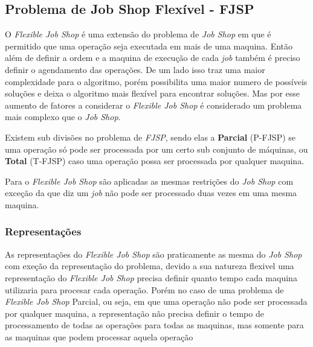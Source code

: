     \subsection{Problema de Job Shop Flexível - FJSP}
            O \textit{Flexible Job Shop} é uma extensão do problema de \textit{Job Shop} em que é permitido que uma operação seja executada em mais de uma maquina. Então além de definir a ordem e a maquina de execução de cada \textit{job} também é preciso definir o agendamento das operações.\newline 
            De um lado isso traz uma maior complexidade para o algoritmo, porém possibilita uma maior numero de possíveis soluções e deixa o algoritmo mais flexível para encontrar soluções. Mas por esse aumento de fatores a considerar o \textit{Flexible Job Shop} é considerado um problema mais complexo que o \textit{Job Shop}.\newline

            Existem sub divisões no problema de \textit{FJSP}, sendo elas a \textbf{Parcial} (P-FJSP) se uma operação só pode ser processada por um certo sub conjunto de máquinas, ou \textbf{Total} (T-FJSP) caso uma operação possa ser processada por qualquer maquina.\newline

            Para o \textit{Flexible Job Shop} são aplicadas as mesmas restrições do \textit{Job Shop} com exceção da que diz um \textit{job} não pode ser processado duas vezes em uma mesma maquina.\newline

        \subsubsection{Representações}
            As representações do \textit{Flexible Job Shop} são praticamente as mesma do \textit{Job Shop} com exeção da representação do problema, devido a sua natureza flexivel uma representação do \textit{Flexible Job Shop} precisa definir quanto tempo cada maquina utilizaria para procesar cada operação. Porém no caso de uma problema de \textit{Flexible Job Shop} Parcial, ou seja, em que uma operação não pode ser processada por qualquer maquina, a representação não precisa definir o tempo de processamento de todas as operações para todas as maquinas, mas somente para as maquinas que podem processar aquela operação


